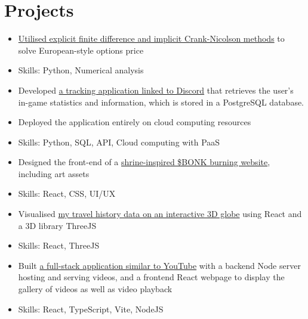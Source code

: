 \documentclass{cv}
\begin{document}
\section{Projects}
\begin{subsections}
    \begin{itemize}
        \item \href{https://github.com/thedylone/black-scholes-numerical}{Utilised explicit finite difference and implicit Crank-Nicolson methods} to solve European-style options price
        \item Skills: Python, Numerical analysis
    \end{itemize}

    \begin{itemize}
        \item Developed \href{https://thedylone.github.io/laffey-bot/}{a tracking application linked to Discord} that retrieves the user's in-game statistics and information, which is stored in a PostgreSQL database.
        \item Deployed the application entirely on cloud computing resources
        \item Skills: Python, SQL, API, Cloud computing with PaaS
    \end{itemize}

    \begin{itemize}
        \item Designed the front-end of a \href{https://bonk-shrine.vercel.app/}{shrine-inspired \$BONK burning website}, including art assets
        \item Skills: React, CSS, UI/UX
    \end{itemize}

    \begin{itemize}
        \item Visualised \href{https://thedylone.github.io/travel-history/}{my travel history data on an interactive 3D globe} using React and a 3D library ThreeJS
        \item Skills: React, ThreeJS
    \end{itemize}

    \begin{itemize}
        \item Built \href{https://github.com/thedylone/node-video-player}{a full-stack application similar to YouTube} with a backend Node server hosting and serving videos, and a frontend React webpage to display the gallery of videos as well as video playback
        \item Skills: React, TypeScript, Vite, NodeJS
    \end{itemize}


\end{subsections}
\end{document}
